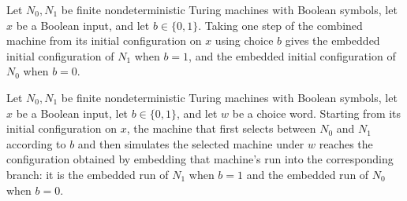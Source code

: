 \begin{theorem}
\label{Turing.FinNDTM.coinBranch_stepWith_init}
\leanok
{}
Let $N_0,N_1$ be finite nondeterministic Turing machines with Boolean symbols, let $x$
be a Boolean input, and let $b\in\{0,1\}$. Taking one step of the combined machine from
its initial configuration on $x$ using choice $b$ gives the embedded initial
configuration of $N_1$ when $b=1$, and the embedded initial configuration of $N_0$ when
$b=0$.
\end{theorem}

\begin{theorem}
\label{Turing.FinNDTM.coinBranch_runWith}
\leanok
{}
Let $N_0,N_1$ be finite nondeterministic Turing machines with Boolean symbols, let $x$
be a Boolean input, let $b\in\{0,1\}$, and let $w$ be a choice word. Starting from its
initial configuration on $x$, the machine that first selects between $N_0$ and $N_1$
according to $b$ and then simulates the selected machine under $w$ reaches the
configuration obtained by embedding that machine's run into the corresponding branch: it
is the embedded run of $N_1$ when $b=1$ and the embedded run of $N_0$ when $b=0$.
\end{theorem}
